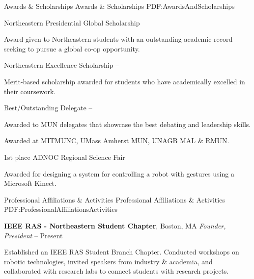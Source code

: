 \documentclass[letterpaper,MMMyyyy,nonstopmode]{simpleresumecv}
\begin{document}
\begin{Body}


\Section
{Awards \&\newline
Scholarships}
{Awards \& Scholarships}
{PDF:AwardsAndScholarships}

\Gap
Northeastern Presidential Global Scholarship
\hfill
{}
\begin{Detail}
Award given to Northeastern students with an outstanding academic record seeking to pursue a global co-op opportunity.
\end{Detail}
\SectionSpace

\Gap
Northeastern Excellence Scholarship
\hfill
{} -- 
\begin{Detail}
Merit-based scholarship awarded for students who have academically excelled in their coursework.
\end{Detail}

\Gap
Best/Outstanding Delegate
\hfill
{} --
\begin{Detail}
Awarded to MUN delegates that showcase the best debating and leadership skills.
\end{Detail}
\begin{Detail}
Awarded at MITMUNC, UMass Amherst MUN, UNAGB MAL \& RMUN.
\end{Detail}

\Gap
1st place ADNOC Regional Science Fair
\hfill
{}
\begin{Detail}
Awarded for designing a system for controlling a robot with gestures using a Microsoft Kinect.
\end{Detail}


\Section
{Professional Affiliations\newline
\& Activities}
{Professional Affiliations \& Activities}
{PDF:ProfessionalAffiliationsActivities}

\Entry
\textbf{IEEE RAS - Northeastern Student Chapter},
Boston, MA
\Gap
\textit{Founder, President}
\hfill
{} --
Present
\begin{Detail}
\Item
Established an IEEE RAS Student Branch Chapter. Conducted workshops on robotic technologies, invited speakers from industry \& academia, and collaborated with research labs to connect students with research projects.
\end{Detail}


\end{Body}
\end{document}
